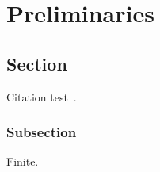 \chapter{Preliminaries}\label{chapter:preliminaries}

\section{Section}
Citation test~\parencite{Paulson1989}.

\subsection{Subsection}

Finite.